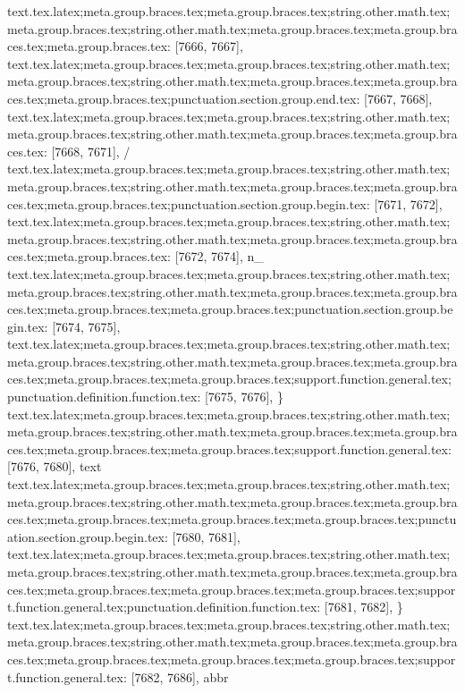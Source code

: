 {{{{{{{{{{{{{{{{{{{{{{{{{{{{{{{{{{{{{{{{{{{{{{{{{{{{{{{{{{{{{{{{{{{{{{{{{{{{{{{{{{{{{{{{{{{{{{{{{{{{{{{{{{{{{{{{{{{{{{{{{{{{{{{{{{{{{{{{{{{{{{{{{{{{{{{{{{{{{{{{{{{{{{{{{{{{{{{{{{{{{{{{{{{{{{{{{{{{{{{{{{{{{{{{{{{{{{{{{text.tex.latex;meta.group.braces.tex;meta.group.braces.tex;string.other.math.tex;meta.group.braces.tex;string.other.math.tex;meta.group.braces.tex;meta.group.braces.tex;meta.group.braces.tex: [7666, 7667], { }
text.tex.latex;meta.group.braces.tex;meta.group.braces.tex;string.other.math.tex;meta.group.braces.tex;string.other.math.tex;meta.group.braces.tex;meta.group.braces.tex;meta.group.braces.tex;punctuation.section.group.end.tex: [7667, 7668], {}}
text.tex.latex;meta.group.braces.tex;meta.group.braces.tex;string.other.math.tex;meta.group.braces.tex;string.other.math.tex;meta.group.braces.tex;meta.group.braces.tex: [7668, 7671], { / }
text.tex.latex;meta.group.braces.tex;meta.group.braces.tex;string.other.math.tex;meta.group.braces.tex;string.other.math.tex;meta.group.braces.tex;meta.group.braces.tex;meta.group.braces.tex;punctuation.section.group.begin.tex: [7671, 7672], {{}
text.tex.latex;meta.group.braces.tex;meta.group.braces.tex;string.other.math.tex;meta.group.braces.tex;string.other.math.tex;meta.group.braces.tex;meta.group.braces.tex;meta.group.braces.tex: [7672, 7674], {n_}
text.tex.latex;meta.group.braces.tex;meta.group.braces.tex;string.other.math.tex;meta.group.braces.tex;string.other.math.tex;meta.group.braces.tex;meta.group.braces.tex;meta.group.braces.tex;meta.group.braces.tex;punctuation.section.group.begin.tex: [7674, 7675], {{}
text.tex.latex;meta.group.braces.tex;meta.group.braces.tex;string.other.math.tex;meta.group.braces.tex;string.other.math.tex;meta.group.braces.tex;meta.group.braces.tex;meta.group.braces.tex;meta.group.braces.tex;support.function.general.tex;punctuation.definition.function.tex: [7675, 7676], {\}
text.tex.latex;meta.group.braces.tex;meta.group.braces.tex;string.other.math.tex;meta.group.braces.tex;string.other.math.tex;meta.group.braces.tex;meta.group.braces.tex;meta.group.braces.tex;meta.group.braces.tex;support.function.general.tex: [7676, 7680], {text}
text.tex.latex;meta.group.braces.tex;meta.group.braces.tex;string.other.math.tex;meta.group.braces.tex;string.other.math.tex;meta.group.braces.tex;meta.group.braces.tex;meta.group.braces.tex;meta.group.braces.tex;meta.group.braces.tex;punctuation.section.group.begin.tex: [7680, 7681], {{}
text.tex.latex;meta.group.braces.tex;meta.group.braces.tex;string.other.math.tex;meta.group.braces.tex;string.other.math.tex;meta.group.braces.tex;meta.group.braces.tex;meta.group.braces.tex;meta.group.braces.tex;meta.group.braces.tex;support.function.general.tex;punctuation.definition.function.tex: [7681, 7682], {\}
text.tex.latex;meta.group.braces.tex;meta.group.braces.tex;string.other.math.tex;meta.group.braces.tex;string.other.math.tex;meta.group.braces.tex;meta.group.braces.tex;meta.group.braces.tex;meta.group.braces.tex;meta.group.braces.tex;support.function.general.tex: [7682, 7686], {abbr}
}}}}}}}}}}}}}}}}}}}}}}}}}}}}}}}}}}}}}}}}}}}}}}}}}}}}}}}}}}}}}}}}}}}}}}}}}}}}}}}}}}}}}}}}}}}}}}}}}}}}}}}}}}}}}}}}}}}}}}}}}}}}}}}}}}}}}}}}}}}}}}}}}}}}}}}}}}}}}}}}}}}}}}}}}}}}}}}}}}}}}}}}}}}}}}}}}}}}}}}}}}}}}}}}}}}}}}}}}}}}}
